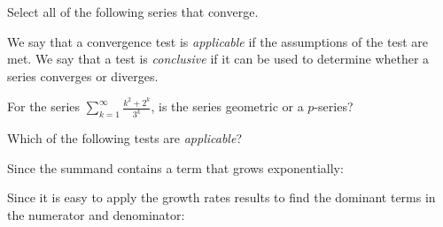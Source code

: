 \documentclass{ximera}
\author{Jim Talamo}
\begin{document}
\begin{exercise}

Select all of the following series that converge.  

\begin{selectAll}
\end{selectAll}

\begin{hint}
We say that a convergence test is \emph{applicable} if the assumptions of the test are met.  We say that a test is \emph{conclusive} if it can be used to determine whether a series converges or diverges.

\begin{question}
For the series $\sum_{k=1}^{\infty} \frac{k^2+2^k}{3^k}$, is the series geometric or a $p$-series?

\begin{multipleChoice}
\end{multipleChoice}

 Which of the following tests are \emph{applicable}?

\begin{selectAll}
\end{selectAll}

Since the summand contains a term that grows exponentially:

\begin{multipleChoice}
\end{multipleChoice}

Since it is easy to apply the growth rates results to find the dominant terms in the numerator and denominator:

\begin{multipleChoice}
\end{multipleChoice}


\end{question}
\end{hint}
\end{exercise}
\end{document}
